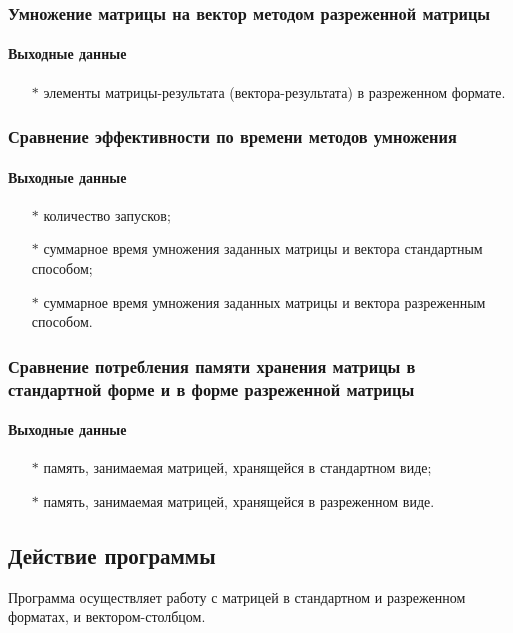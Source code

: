 \documentclass[a4paper,12pt]{extarticle}
\begin{document}
\subsubsection{Умножение матрицы на вектор методом разреженной матрицы}
\paragraph{Выходные данные}
\begin{itemize}
    \item[$*$] элементы матрицы-результата (вектора-результата) в разреженном формате.
\end{itemize}

\subsubsection{Сравнение эффективности по времени методов умножения}

\paragraph{Выходные данные}
\begin{itemize}
    \item[$*$] количество запусков;
    \item[$*$] суммарное время умножения заданных матрицы и вектора стандартным способом;
    \item[$*$] суммарное время умножения заданных матрицы и вектора разреженным способом.
\end{itemize}

\subsubsection{Сравнение потребления памяти хранения матрицы в стандартной форме и в форме разреженной матрицы}

\paragraph{Выходные данные}
\begin{itemize}
    \item[$*$] память, занимаемая матрицей, хранящейся в стандартном виде;
    \item[$*$] память, занимаемая матрицей, хранящейся в разреженном виде.
\end{itemize}

\subsection{Действие программы}
Программа осуществляет работу с матрицей в стандартном и разреженном форматах, и вектором-столбцом.
\end{document}
